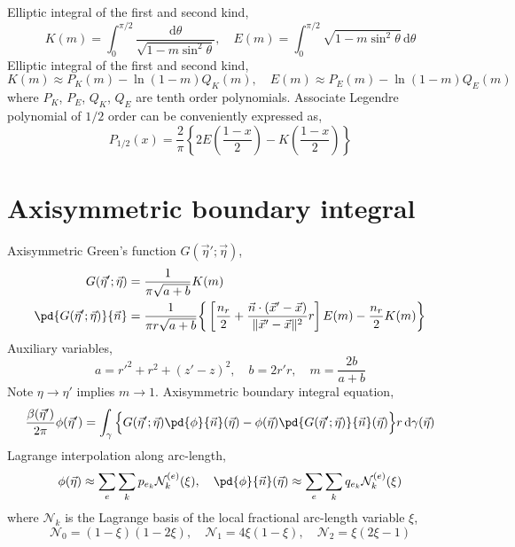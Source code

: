 \documentclass{jfm}
\begin{document}
Elliptic integral of the first and second kind,
\begin{equation}
K(m)=\int_0^{\pi/2}\frac{\mathrm{d}\theta}{\sqrt{1-m \sin^2 \theta}},\quad
E(m)=\int_0^{\pi/2}\sqrt{1-m \sin^2 \theta}\,\mathrm{d}\theta
\end{equation}
Elliptic integral of the first and second kind,
\begin{equation}
K(m)\approx P_K(m) -\ln(1-m) Q_K(m),\quad
E(m)\approx P_E(m) -\ln(1-m) Q_E(m) 
\end{equation}
where $P_K$, $P_E$, $Q_K$, $Q_E$ are tenth order polynomials.
Associate Legendre polynomial of $1/2$ order can be conveniently expressed as,
\begin{equation}
P_{1/2}(x)=\frac{2}{\pi}\left\{2 E\left(\frac{1-x}{2}\right)-K\left(\frac{1-x}{2}\right)\right\}
\end{equation}

\section{Axisymmetric boundary integral}
Axisymmetric Green's function $G(\vec{\eta}';\vec{\eta})$,
\begin{align}
G(\vec{\eta}';\vec{\eta})&=\frac{1}{\pi\sqrt{a+b}}K(m)\\
\pd{G(\vec{\eta}';\vec{\eta})}{\vec{n}}&=
\frac{1}{\pi r\sqrt{a+b}}\bigg\{
\left[\frac{n_r}{2}+\frac{\vec{n}\cdot(\vec{x}'-\vec{x})}{\|\vec{x}'-\vec{x}\|^2}r\right]E(m)
-\frac{n_r}{2}K(m)\bigg\}
\end{align}
Auxiliary variables,
\begin{equation}
a=r'^2+r^2+(z'-z)^2,\quad b = 2 r' r,\quad m =\frac{2 b}{a+b}
\end{equation}
Note $\eta\to\eta'$ implies $m\to 1$.
Axisymmetric boundary integral equation,
\begin{equation}
\frac{\beta(\vec{\eta}')}{2\pi}\phi(\vec{\eta}')=\int_{\gamma}
\Big\{
G(\vec{\eta}';\vec{\eta})\pd{\phi}{\vec{n}}(\vec{\eta})-
\phi(\vec{\eta})\pd{G(\vec{\eta}';\vec{\eta})}{\vec{n}}(\vec{\eta})
\Big\}
 r \,\mathrm{d}\gamma(\vec{\eta})
\end{equation}
Lagrange interpolation along arc-length,
\begin{equation}
\phi(\vec{\eta})\approx\sum_e \sum_k p_{e_k}\mathcal{N}^{(e)}_k(\xi),\quad
\pd{\phi}{\vec{n}}(\vec{\eta})\approx\sum_e \sum_kq_{e_k}\mathcal{N}^{(e)}_k(\xi)
\end{equation}
where $\mathcal{N}_k$ is the Lagrange basis of the local fractional arc-length variable $\xi$,
\begin{equation}
\mathcal{N}_0=(1 - \xi) (1 - 2\xi),\quad
\mathcal{N}_1=4 \xi (1 - \xi) ,\quad
\mathcal{N}_2=\xi (2 \xi- 1)
\end{equation}
\end{document}
